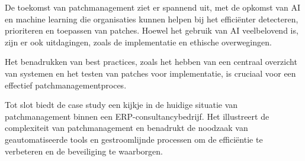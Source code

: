 De toekomst van patchmanagement ziet er spannend uit, met de opkomst van AI en machine learning die organisaties kunnen helpen bij het efficiënter detecteren, prioriteren en toepassen van patches. Hoewel het gebruik van AI veelbelovend is, zijn er ook uitdagingen, zoals de implementatie en ethische overwegingen.

Het benadrukken van best practices, zoals het hebben van een centraal overzicht van systemen en het testen van patches voor implementatie, is cruciaal voor een effectief patchmanagementproces.

Tot slot biedt de case study een kijkje in de huidige situatie van patchmanagement binnen een ERP-consultancybedrijf. Het illustreert de complexiteit van patchmanagement en benadrukt de noodzaak van geautomatiseerde tools en gestroomlijnde processen om de efficiëntie te verbeteren en de beveiliging te waarborgen.